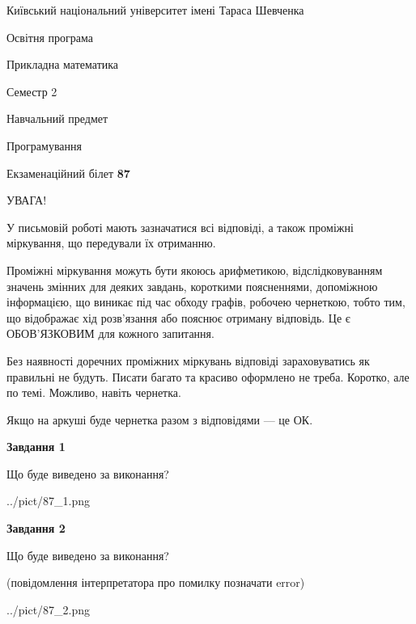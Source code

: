 \documentclass[12pt, ukrainian]{article}
\begin{document}
{{\begin {small}\par
{ \center  Київський національний університет імені Тараса Шевченка \par}
{\parbox {5 cm}{Освітня програма \hfill}{\parbox {7 cm}{Прикладна математика\hfill}}\parbox {6 cm}{\hfill Семестр 2}}\par
{\parbox {5 cm} {Навчальний предмет \hfill}\parbox {7 cm}{Програмування \hfill}\parbox {6cm}{\hfill}\par}\vspace{-7pt} \end{small}}{\center Екзаменаційний білет \No \textbf
{ 87 }\par}}
{
\begin {large}
УВАГА!

У письмовій роботі мають зазначатися всі відповіді, а також проміжні міркування, що передували їх отриманню.

Проміжні міркування можуть бути якоюсь арифметикою, відслідковуванням зна\-чень змінних для деяких завдань,
короткими поясненнями, допоміжною інформацією, що виникає під час обходу графів, робочею чернеткою,
тобто тим, що відображає хід розв’язання або пояснює отриману відповідь.
Це є ОБОВ’ЯЗКОВИМ для кожного запитання.

Без наявності доречних проміжних міркувань відповіді зараховуватись як правиль\-ні не будуть.
Писати багато та красиво оформлено не треба. Коротко, але по темі. Можли\-во, навіть чернетка.

Якщо на аркуші буде чернетка разом з відповідями --- це ОК.

\newpage

{\begin {center}\textbf{Завдання 1}\end {center}}\par
Що буде виведено за виконання?\par
\begin{center}
	{../pict/87_1.png}
\end{center}
\newpage

{\begin {center}\textbf{Завдання 2}\end {center}}\par
Що буде виведено за виконання?\par
 (повідомлення інтерпретатора про помилку позначати error)\par
\begin{center}
	{../pict/87_2.png}
\end{center}
\newpage


\end{large}}
\end{document}
